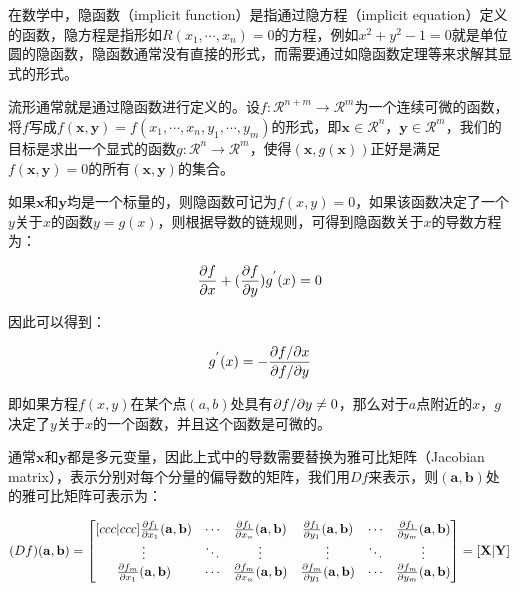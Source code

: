 在数学中，隐函数（implicit function）是指通过隐方程（implicit equation）定义的函数，隐方程是指形如$R(x_1,\cdots,x_n)=0$的方程，例如$x^{2}+y^{2}-1=0$就是单位圆的隐函数，隐函数通常没有直接的形式，而需要通过如隐函数定理等来求解其显式的形式。

流形通常就是通过隐函数进行定义的。设$f:\mathcal{R}^{n+m}\to \mathcal{R}^{m}$为一个连续可微的函数，将$f$写成$f(\mathbf{x},\mathbf{y})=f(x_1,\cdots,x_n,y_1,\cdots,y_m)$的形式，即$\mathbf{x}\in\mathcal{R}^{n}$，$\mathbf{y}\in\mathcal{R}^{m}$，我们的目标是求出一个显式的函数$g:\mathcal{R}^{n}\to\mathcal{R}^{m}$，使得$(\mathbf{x},g(\mathbf{x}))$正好是满足$f(\mathbf{x},\mathbf{y})=0$的所有$(\mathbf{x},\mathbf{y})$的集合。

如果$\mathbf{x}$和$\mathbf{y}$均是一个标量的，则隐函数可记为$f(x,y)=0$，如果该函数决定了一个$y$关于$x$的函数$y=g(x)$，则根据导数的链规则，可得到隐函数关于$x$的导数方程为：

\begin{equation}
	\frac{{\rm \partial} f}{{\rm \partial} x}+(\frac{{\rm \partial} f}{{\rm \partial} y})g^{'}(x)=0
\end{equation}

\noindent 因此可以得到：

\begin{equation}\label{e:mlt-explicit-function}
	g^{'}(x)=-\frac{{\rm \partial} f/{\rm \partial} x}{{\rm \partial} f/{\rm \partial} y}
\end{equation}

\noindent 即如果方程$f(x,y)$在某个点$(a,b)$处具有${\rm \partial} f/{\rm \partial} y\neq 0$，那么对于$a$点附近的$x$，$g$决定了$y$关于$x$的一个函数，并且这个函数是可微的。

通常$\mathbf{x}$和$\mathbf{y}$都是多元变量，因此上式中的导数需要替换为雅可比矩阵（Jacobian matrix），表示分别对每个分量的偏导数的矩阵，我们用$Df$来表示，则$(\mathbf{a},\mathbf{b})$处的雅可比矩阵可表示为：

\begin{equation}\label{e:mlt-jacobian}
	(Df)(\mathbf{a},\mathbf{b})=\begin{bmatrix}[ccc|ccc]
		\frac{{\rm \partial} f_1}{{\rm \partial} x_1}(\mathbf{a},\mathbf{b})&\cdots &\frac{{\rm \partial} f_1}{{\rm \partial} x_n}(\mathbf{a},\mathbf{b}) &\frac{{\rm \partial} f_1}{{\rm \partial} y_1}(\mathbf{a},\mathbf{b})&\cdots &\frac{{\rm \partial} f_1}{{\rm \partial} y_m}(\mathbf{a},\mathbf{b})\\
		\vdots & \ddots & \vdots & \vdots & \ddots & \vdots \\
		\frac{{\rm \partial} f_m}{{\rm \partial} x_1}(\mathbf{a},\mathbf{b})&\cdots & \frac{{\rm \partial} f_m}{{\rm \partial} x_n}(\mathbf{a},\mathbf{b}) &\frac{{\rm \partial} f_m}{{\rm \partial} y_1}(\mathbf{a},\mathbf{b})&\cdots & \frac{{\rm \partial} f_m}{{\rm \partial} y_m}(\mathbf{a},\mathbf{b})
	\end{bmatrix}=[\mathbf{X}|\mathbf{Y}]
\end{equation}

